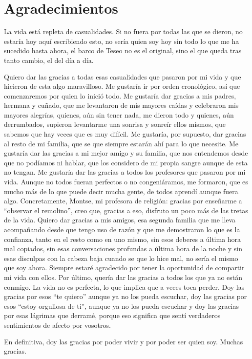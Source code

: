 \pagestyle{plain}
\chapter*{Agradecimientos}

La vida está repleta de casualidades. Si no fuera por todas las que se dieron, no estaría hoy aquí escribiendo esto, no sería quien soy hoy sin todo lo que me ha sucedido hasta ahora, el barco de Teseo no es el original, sino el que queda tras tanto cambio, el del día a día.

Quiero dar las gracias a todas esas casualidades que pasaron por mi vida y que hicieron de esta algo maravilloso. Me gustaría ir por orden cronológico, así que comenzaremos por quien lo inició todo. Me gustaría dar gracias a mis padres, hermana y cuñado, que me levantaron de mis mayores caídas y celebraron mis mayores alegrías, quienes, aún sin tener nada, me dieron todo y quienes, aún derrumbados, supieron levantarme una sonrisa y sonreír ellos mismos, que sabemos que hay veces que es muy difícil. Me gustaría, por supuesto, dar gracias al resto de mi familia, que se que siempre estarán ahí para lo que necesite. Me gustaría dar las gracias a mi mejor amigo y su familia, que nos entendemos desde que no podíamos ni hablar, que los considero de mi propia sangre aunque de esta no tengan. Me gustaría dar las gracias a todos los profesores que pasaron por mi vida. Aunque no todos fueran perfectos o no congeniáramos, me formaron, que es mucho más de lo que puede decir mucha gente, de todos aprendí aunque fuera algo. Concretamente, Montse, mi profesora de religión: gracias por enseñarme a ``observar el remolino'', creo que, gracias a eso, disfruto un poco más de las tretas de la vida. Quiero dar gracias a mis amigos, esa segunda familia que me lleva acompañando desde que tengo uso de razón y que me demostraron lo que es la confianza, tanto en el resto como en uno mismo, sin esos deberes a última hora mal copiados, sin esas conversaciones profundas a última hora de la noche y sin esas disculpas con la cabeza baja cuando se que lo hice mal, no sería el mismo que soy ahora. Siempre estaré agradecido por tener la oportunidad de compartir mi vida con ellos. Por último, quería dar las gracias a todos los que ya no están conmigo. La vida no es perfecta, lo que implica que a veces toca perder. Doy las gracias por esos ``te quiero'' aunque ya no los pueda escuchar, doy las gracias por esos ``estoy orgullosa de ti'', aunque ya no los pueda escuchar y doy las gracias por esas lágrimas que derramé, porque eso significa que sentí verdaderos sentimientos de afecto por vosotros.

En definitiva, doy las gracias por poder vivir y por poder ser quien soy. Muchas gracias.
